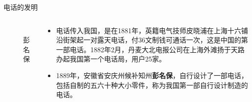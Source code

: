 \documentclass{ctexbeamer}
\begin{document}
\begin{frame}{电话的发明}
  \begin{columns}
    \begin{column}{0.35\linewidth}
      \begin{figure}
        \includegraphics[width=3.5cm]{pengmingbao}
        \caption{彭名保}
      \end{figure}
    \end{column}
    \begin{column}{0.65\linewidth}
      \begin{itemize}
        \item 电话传入我国，是在1881年，英籍电气技师皮晓浦在上海十六铺沿街架起一对露天电话，付36文制钱可通话一次，这是中国的第一部电话。1882年2月，丹麦大北电报公司在上海外滩扬于天路办起我国第一个电话局，用户25家。
        \item 1889年，安徽省安庆州候补知州\textbf{彭名保}，自行设计了一部电话，包括自制的五六十种大小零件，称为我国第一部自行设计制造的电话。
      \end{itemize}
    \end{column}
  \end{columns}
\end{frame}
\end{document}
